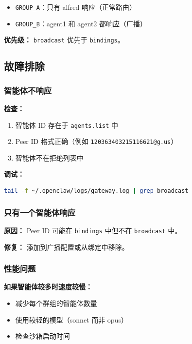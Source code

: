 \begin{itemize}
  \item \texttt{GROUP\_A}：只有 alfred 响应（正常路由）
  \item \texttt{GROUP\_B}：agent1 和 agent2 都响应（广播）
\end{itemize}


\textbf{优先级：} \texttt{broadcast} 优先于 \texttt{bindings}。

\subsection{故障排除}


\subsubsection{智能体不响应}


\textbf{检查：}

\begin{enumerate}
  \item 智能体 ID 存在于 \texttt{agents.list} 中
  \item Peer ID 格式正确（例如 \texttt{120363403215116621@g.us}）
  \item 智能体不在拒绝列表中
\end{enumerate}


\textbf{调试：}

\begin{lstlisting}[language=bash]
tail -f ~/.openclaw/logs/gateway.log | grep broadcast
\end{lstlisting}


\subsubsection{只有一个智能体响应}


\textbf{原因：} Peer ID 可能在 \texttt{bindings} 中但不在 \texttt{broadcast} 中。

\textbf{修复：} 添加到广播配置或从绑定中移除。

\subsubsection{性能问题}


\textbf{如果智能体较多时速度较慢：}

\begin{itemize}
  \item 减少每个群组的智能体数量
  \item 使用较轻的模型（sonnet 而非 opus）
  \item 检查沙箱启动时间
\end{itemize}


